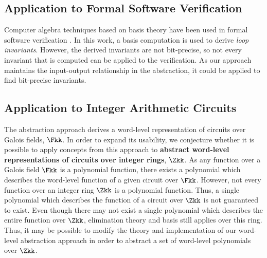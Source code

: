 \subsection{Application to Formal Software Verification}
Computer algebra techniques based on \Grobner basis theory have been used 
in formal software verification \cite{manna:program}.
In this work, a \Grobner basis computation is used to derive {\it loop invariants}.
However, the derived invariants are not bit-precise, so not every invariant that is
computed can be applied to the verification. As our approach maintains
the input-output relationship in the abstraction, it could be applied to
find bit-precise invariants.


\subsection{Application to Integer Arithmetic Circuits}
The abstraction approach derives a
word-level representation of circuits over Galois fields, $\Fkk$. 
In order to expand its usability, we conjecture whether it is possible to 
apply concepts from this approach to {\bf abstract word-level representations 
of circuits over integer rings}, $\Zkk$. 
As any function over a Galois 
field $\Fkk$ is a polynomial function, there exists a polynomial which 
describes the word-level function of a given circuit over $\Fkk$. 
However, not every function over an integer ring $\Zkk$ is a polynomial 
function. 
Thus, a single polynomial which describes the function of a circuit over 
$\Zkk$ is not guaranteed to exist. 
Even though there may not exist a single polynomial which describes the
entire function over $\Zkk$, elimination theory and \Grobner basis still
applies over this ring. Thus, it may be possible to modify the theory and 
implementation of our word-level 
abstraction approach in order to abstract a set of word-level 
polynomials over $\Zkk$.

